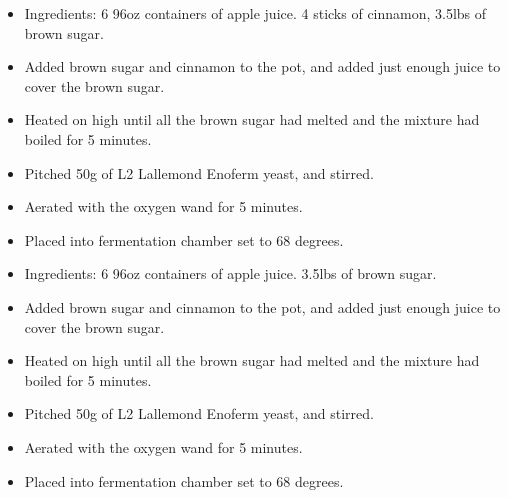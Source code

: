 \begin{itemize}
    \item Ingredients: 6 96oz containers of apple juice.  4 sticks of cinnamon, 3.5lbs of brown sugar.
    \item Added brown sugar and cinnamon to the pot, and added just enough juice to cover the brown sugar.
    \item Heated on high until all the brown sugar had melted and the mixture had boiled for 5 minutes.
    \item Pitched 50g of L2 Lallemond Enoferm yeast, and stirred.
    \item Aerated with the oxygen wand for 5 minutes.
    \item Placed into fermentation chamber set to 68 degrees.
\end{itemize}

\def\todaysdate{20200330}
\newday{\todaysdate}\label{\todaysdate}

\begin{itemize}
    \item Ingredients: 6 96oz containers of apple juice. 3.5lbs of brown sugar.
    \item Added brown sugar and cinnamon to the pot, and added just enough juice to cover the brown sugar.
    \item Heated on high until all the brown sugar had melted and the mixture had boiled for 5 minutes.
    \item Pitched 50g of L2 Lallemond Enoferm yeast, and stirred.
    \item Aerated with the oxygen wand for 5 minutes.
    \item Placed into fermentation chamber set to 68 degrees.
\end{itemize}

